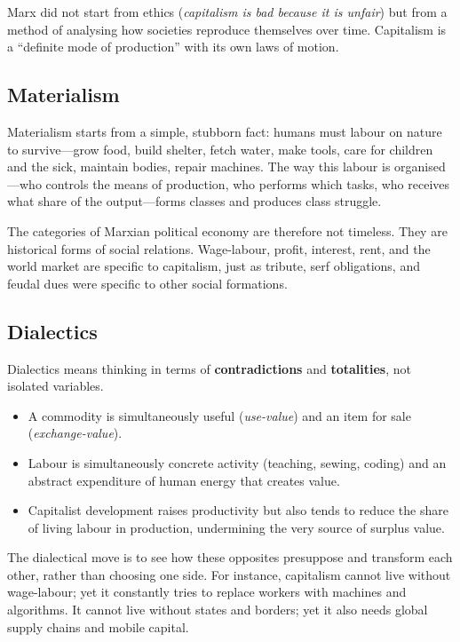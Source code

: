 Marx did not start from ethics (\emph{capitalism is bad because it is unfair})
but from a method of analysing how societies reproduce themselves over time.
Capitalism is a ``definite mode of production'' with its own laws of motion.\cite{Marx1867,MarxGrundrisse}

\subsection{Materialism}

Materialism starts from a simple, stubborn fact: humans must labour on nature to
survive---grow food, build shelter, fetch water, make tools, care for children and
the sick, maintain bodies, repair machines. The way this labour is organised---who
controls the means of production, who performs which tasks, who receives what share
of the output---forms classes and produces class struggle.

The categories of Marxian political economy are therefore not timeless. They are
historical forms of social relations. Wage-labour, profit, interest, rent, and the
world market are specific to capitalism, just as tribute, serf obligations, and feudal
dues were specific to other social formations.

\subsection{Dialectics}

Dialectics means thinking in terms of \textbf{contradictions} and \textbf{totalities},
not isolated variables.

\begin{itemize}[leftmargin=1.5em]
  \item A commodity is simultaneously useful (\emph{use-value}) and an item for sale (\emph{exchange-value}).
  \item Labour is simultaneously concrete activity (teaching, sewing, coding) and an abstract expenditure
        of human energy that creates value.
  \item Capitalist development raises productivity but also tends to reduce the share of living labour in
        production, undermining the very source of surplus value.
\end{itemize}

The dialectical move is to see how these opposites presuppose and transform each other,
rather than choosing one side. For instance, capitalism cannot live without wage-labour;
yet it constantly tries to replace workers with machines and algorithms. It cannot live
without states and borders; yet it also needs global supply chains and mobile capital.

